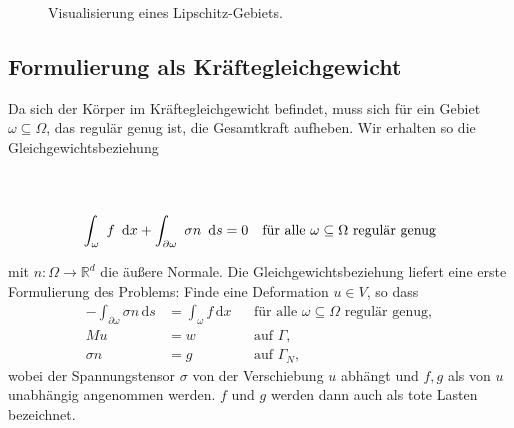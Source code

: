 \documentclass{scrartcl}
\newcommand{\tikzmark}[3][]{\tikz[remember picture,baseline] \node [anchor=base,#1](#2) {$#3$};}
\def\R{\mathbb{R}}
\newcommand{\dif}[1]{\,\mathrm{d} #1}
\begin{document}
\begin{figure}[h]
\centering

\caption{Visualisierung eines Lipschitz-Gebiets.}
\label{dr:LipschitzDefinition}
\end{figure}

\subsection{Formulierung als Kräftegleichgewicht}

Da sich der Körper im Kräftegleichgewicht befindet, muss sich für ein Gebiet $\omega\subseteq\Omega$, das regulär genug ist, die Gesamtkraft aufheben. Wir erhalten so die Gleichgewichtsbeziehung
\begin{nopagebreak}
\begin{align*}
	\\ \\
	\int_\omega \tikzmark{forcevol}{f}\dif x+\int_{\partial\omega}\tikzmark{forcesurf}{\sigma n}\dif s&=0 &\text{für alle }\omega\subseteq\Omega\text{ regulär genug}
\end{align*}
%
\end{nopagebreak}%
mit $n\colon\Omega\to\R^d$ die äußere Normale.
 Die Gleichgewichtsbeziehung liefert eine erste Formulierung des Problems: Finde eine Deformation $u\in V$, so dass
\begin{align*}
	-\int_{\partial\omega}\sigma n\dif s&=\int_\omega f\dif x &&\text{für alle }\omega\subseteq\Omega\text{ regulär genug}, \\
	Mu &= w &&\text{auf }\Gamma, \\
	\sigma n&= g &&\text{auf }\Gamma_N,
\end{align*}
wobei der Spannungstensor $\sigma$ von der Verschiebung $u$ abhängt und $f,g$ als von $u$ unabhängig angenommen werden. $f$ und $g$ werden dann auch als tote Lasten bezeichnet.
\end{document}
